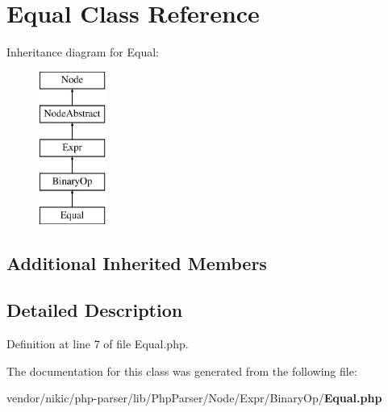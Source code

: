 \section{Equal Class Reference}
\label{class_php_parser_1_1_node_1_1_expr_1_1_binary_op_1_1_equal}
Inheritance diagram for Equal\+:\begin{figure}[H]
\begin{center}
\leavevmode
\includegraphics[height=5.000000cm]{class_php_parser_1_1_node_1_1_expr_1_1_binary_op_1_1_equal}
\end{center}
\end{figure}
\subsection*{Additional Inherited Members}


\subsection{Detailed Description}


Definition at line 7 of file Equal.\+php.



The documentation for this class was generated from the following file\+:\begin{DoxyCompactItemize}
\item 
vendor/nikic/php-\/parser/lib/\+Php\+Parser/\+Node/\+Expr/\+Binary\+Op/{\bf Equal.\+php}\end{DoxyCompactItemize}
